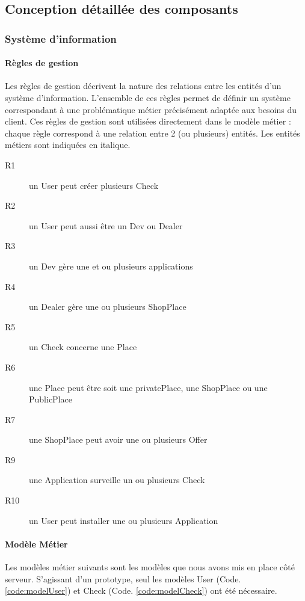 \documentclass[a4paper,12pt]{report}
\begin{document}
\begin{onehalfspace}
\chapter{Conception détaillée des composants}
\subsection{Système d’information}
\subsubsection{Règles de gestion}

  Les règles de gestion décrivent la nature des relations entre les entités d’un système d’information. L’ensemble de ces règles permet de définir un système correspondant à une problématique métier précisément adaptée aux besoins du client. Ces règles de gestion sont utilisées directement dans le modèle métier : chaque règle correspond à une relation  entre 2 (ou plusieurs) entités. Les entités métiers sont indiquées en italique.

\begin{description}
  \item[R1] un User peut créer plusieurs Check
  \item[R2] un User peut aussi être un Dev ou Dealer
  \item[R3] un Dev gère une et ou plusieurs applications
  \item[R4] un Dealer gère une ou plusieurs ShopPlace
  \item[R5] un Check concerne une Place
  \item[R6] une Place peut être soit une privatePlace, une ShopPlace ou une PublicPlace
  \item[R7] une ShopPlace peut avoir une ou plusieurs Offer
  \item[R9] une Application surveille un ou plusieurs Check
  \item[R10] un User peut installer une ou plusieurs Application
\end{description}

\subsubsection{Modèle Métier}
Les modèles métier suivants sont les modèles que nous avons mis en place côté serveur. S'agissant d'un prototype, seul les modèles User (Code. \ref{code:modelUser}) et Check (Code. \ref{code:modelCheck}) ont été nécessaire.


\end{onehalfspace}
\end{document}
